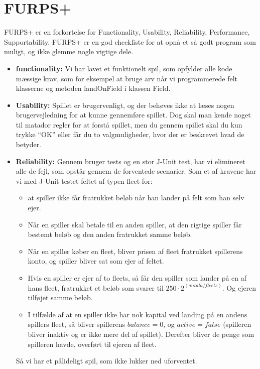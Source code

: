 \section*{FURPS+}
FURPS+ er en forkortelse for Functionality, Usability, Reliability, Performance,
Supportability. FURPS+ er en god checkliste for at opnå et så godt program som
muligt, og ikke glemme nogle vigtige dele.
\begin{itemize}
  \item \textbf{functionality:} Vi har lavet et funktionelt spil, som opfylder
  alle kode mæssige krav, som for eksempel at bruge arv når vi programmerede felt
  klasserne og metoden landOnField i klassen Field.
  \item \textbf{Usability:} Spillet er brugervenligt, og der behøves ikke at
  læses nogen brugervejledning for at kunne gennemføre spillet. Dog skal man
  kende noget til matador regler for at forstå spillet, men du gennem spillet
  skal du kun trykke “OK” eller får du to valgmuligheder, hvor der er beskrevet
  hvad de betyder.
  \item \textbf{Reliability:} Gennem bruger tests og en stor J-Unit test, har vi
  elimineret alle de fejl, som opstår gennem de forventede scenarier. Som et af
  kravene har vi med J-Unit testet feltet af typen fleet for:
  \begin{itemize}
    \item at spiller ikke får fratrukket beløb når han lander på felt som han
    selv ejer.
    \item Når en spiller skal betale til en anden spiller, at den rigtige
    spiller får bestemt beløb og den anden fratrukket samme beløb.
    \item Når en spiller køber en fleet, bliver prisen af fleet fratrukket
    spillerens konto, og spiller bliver sat som ejer af feltet.
    \item Hvis en spiller er ejer af to fleets, så får den spiller som lander på
    en af hans fleet, fratrukket et beløb som svarer til $250 \cdot 2^(antal af
    fleets)$. Og ejeren tilføjet samme beløb.
    \item I tilfælde af at en spiller ikke har nok kapital ved landing på en
    andens spillers fleet, så bliver spillerens $balance = 0$, og
    $active = false$ (spilleren bliver inaktiv og er ikke mere del af
    spillet). Derefter bliver de penge som spilleren havde, overført til ejeren
    af fleet.
  \end{itemize}
  Så vi har et pålideligt spil, som ikke lukker ned uforventet.

\end{itemize}
